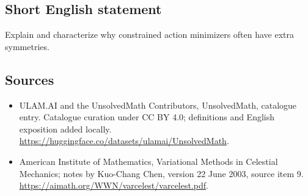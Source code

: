 \documentclass[11pt]{article}
\begin{document}
\subsection{Short English statement}
Explain and characterize why constrained action minimizers often have extra symmetries.
\subsection{Sources}
\begin{itemize}
\item[\hypertarget{source:statement:1}{S1}] ULAM.AI and the UnsolvedMath Contributors, UnsolvedMath, catalogue entry. Catalogue curation under CC BY 4.0; definitions and English exposition added locally.
\url{https://huggingface.co/datasets/ulamai/UnsolvedMath}.
\item[\hypertarget{source:statement:2}{S2}] American Institute of Mathematics, Variational Methods in Celestial Mechanics; notes by Kuo-Chang Chen, version 22 June 2003, source item 9.
\url{https://aimath.org/WWN/varcelest/varcelest.pdf}.
\end{itemize}
\label{end:statement}
\end{document}
